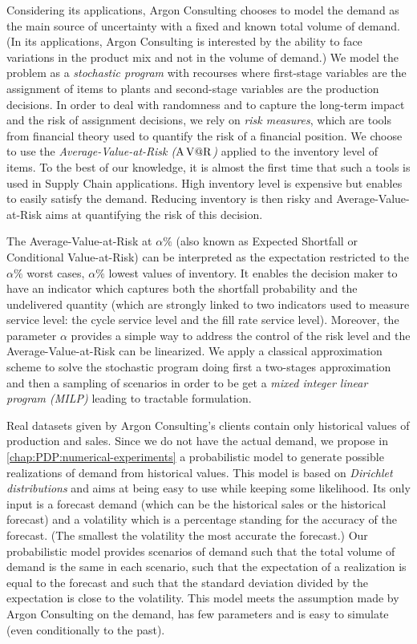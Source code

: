 Considering its applications, Argon Consulting chooses to model the demand as the main source of uncertainty with a fixed and known total volume of demand.
(In its applications, Argon Consulting is interested by the ability to face variations in the product mix and not in the volume of demand.)
We model the problem as a \emph{stochastic program} with recourses where first-stage variables are the assignment of items to plants and second-stage variables are the production decisions.
In order to deal with randomness and to capture the long-term impact and the risk of assignment decisions, we rely on \emph{risk measures}, which are tools from financial theory used to quantify the risk of a financial position.
We choose to use the \emph{Average-Value-at-Risk ($\operatorname{A\operatorname{V@R}}$)} applied to the inventory level of items.
To the best of our knowledge, it is almost the first time that such a tools is used in Supply Chain applications.
High inventory level is expensive but enables to easily satisfy the demand.
Reducing inventory is then risky and Average-Value-at-Risk aims at quantifying the risk of this decision.


The Average-Value-at-Risk at $\alpha\%$ (also known as Expected Shortfall or Conditional Value-at-Risk) can be interpreted as the expectation restricted to the $\alpha\%$ worst cases, \ie $\alpha\%$ lowest values of inventory.
It enables the decision maker to have an indicator which captures both the shortfall probability and the undelivered quantity (which are strongly linked to two indicators used to measure service level: the cycle service level and the fill rate service level).
Moreover, the parameter $\alpha$ provides a simple way to address the control of the risk level and the Average-Value-at-Risk can be linearized.
We apply a classical approximation scheme to solve the stochastic program doing first a two-stages approximation and then a sampling of scenarios in order to be get a \emph{mixed integer linear program (MILP)} leading to tractable formulation.


\medskip


Real datasets given by Argon Consulting's clients contain only historical values of production and sales.
Since we do not have the actual demand, we propose in \cref{chap:PDP:numerical-experiments} a probabilistic model to generate possible realizations of demand from historical values.
This model is based on \emph{Dirichlet distributions} and aims at being easy to use while keeping some likelihood.
Its only input is a forecast demand (which can be the historical sales or the historical forecast) and a volatility which is a percentage standing for the accuracy of the forecast.
(The smallest the volatility the most accurate the forecast.)
Our probabilistic model provides scenarios of demand such that the total volume of demand is the same in each scenario, such that the expectation of a realization is equal to the forecast and such that the standard deviation divided by the expectation is close to the volatility.
This model meets the assumption made by Argon Consulting on the demand, has few parameters and is easy to simulate (even conditionally to the past).


